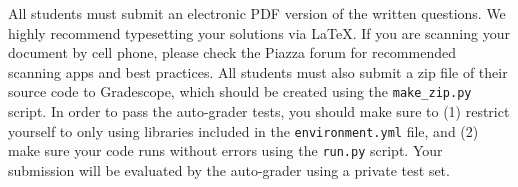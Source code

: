 All students must submit an electronic PDF version of the written questions. We
highly recommend typesetting your solutions via \LaTeX. If you are scanning
your document by cell phone, please check the Piazza forum for recommended
scanning apps and best practices. All students must also submit a zip file of
their source code to Gradescope, which should be created using the
\texttt{make\_zip.py} script. In order to pass the auto-grader tests, you
should make sure to (1) restrict yourself to only using libraries included in
the
\texttt{environment.yml} file, and (2) make sure your code runs without errors
using the \texttt{run.py} script.  Your submission will be evaluated by the
auto-grader using a private test set.
